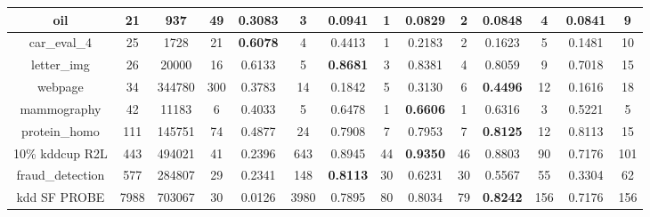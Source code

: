 \begin{table*}[]
{\begin{tabular}{|c|c|c|c|c|c|c|c|c|c|c|c|c|c|}
oil                      & 21                  & 937                     & 49                       & \textbf{0.3083} & 3      & 0.0941            & 1      & 0.0829            & 2      & 0.0848             & 4      & 0.0841        & 9           \\ \hline
car\_eval\_4             & 25                  & 1728                    & 21                       & \textbf{0.6078} & 4      & 0.4413            & 1      & 0.2183            & 2      & 0.1623             & 5      & 0.1481        & 10          \\ \hline
letter\_img              & 26                  & 20000                   & 16                       & 0.6133          & 5      & \textbf{0.8681}   & 3      & 0.8381            & 4      & 0.8059             & 9      & 0.7018        & 15          \\ \hline
webpage                  & 34                  & 344780                  & 300                      & 0.3783          & 14     & 0.1842            & 5      & 0.3130            & 6      & \textbf{0.4496}    & 12     & 0.1616        & 18          \\ \hline
mammography              & 42                  & 11183                   & 6                        & 0.4033          & 5      & 0.6478            & 1      & \textbf{0.6606}   & 1      & 0.6316             & 3      & 0.5221        & 5           \\ \hline
protein\_homo            & 111                 & 145751                  & 74                       & 0.4877          & 24     & 0.7908            & 7      & 0.7953            & 7      & \textbf{0.8125}    & 12     & 0.8113        & 15          \\ \hline
10\% kddcup R2L          & 443                 & 494021                  & 41                       & 0.2396          & 643    & 0.8945            & 44     & \textbf{0.9350}   & 46     & 0.8803             & 90     & 0.7176        & 101         \\ \hline
fraud\_detection         & 577                 & 284807                  & 29                       & 0.2341          & 148    & \textbf{0.8113}   & 30     & 0.6231            & 30     & 0.5567             & 55     & 0.3304        & 62          \\ \hline
kdd SF PROBE             & 7988                & 703067                  & 30                       & 0.0126          & 3980   & 0.7895            & 80     & 0.8034            & 79     & \textbf{0.8242}    & 156    & 0.7176        & 156         \\ \hline

\end{tabular}}
\end{table*}
